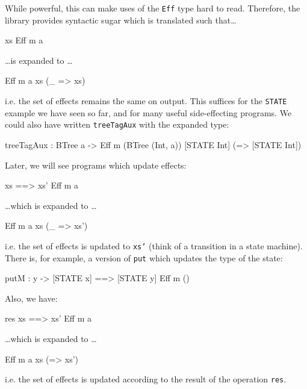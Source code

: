 \noindent
While powerful, this can make uses of the \texttt{Eff} type hard to read.
Therefore, the \effects{} library provides syntactic sugar which is translated
such that\ldots

\begin{code}
{ xs } Eff m a 
\end{code}

\ldots is expanded to \ldots

\begin{code}
Eff m a xs (\_ => xs)
\end{code}

\noindent
i.e. the set of effects remains the same on output. This suffices for the
\texttt{STATE} example we have seen so far, and for many useful side-effecting
programs. We could also have written \texttt{treeTagAux} with the expanded
type:

\begin{code}
treeTagAux : BTree a -> 
             Eff m (BTree (Int, a)) [STATE Int] (\x => [STATE Int])
\end{code}

\noindent
Later, we will see programs which update effects:

\begin{code}
{ xs ==> xs' } Eff m a
\end{code}

\ldots which is expanded to \ldots

\begin{code}
Eff m a xs (\_ => xs')
\end{code}

\noindent
i.e. the set of effects is updated to \texttt{xs'} (think of a transition
in a state machine). There is, for example, a version of \texttt{put} which
updates the type of the state:

\begin{code}
putM : y -> { [STATE x] ==> [STATE y] } Eff m () 
\end{code}

\noindent
Also, we have:

\begin{code}
{ {res} xs ==> xs' } Eff m a
\end{code}

\ldots which is expanded to \ldots

\begin{code}
Eff m a xs (\res => xs')
\end{code}

\noindent
i.e. the set of effects is updated according to the result of the operation
\texttt{res}.




